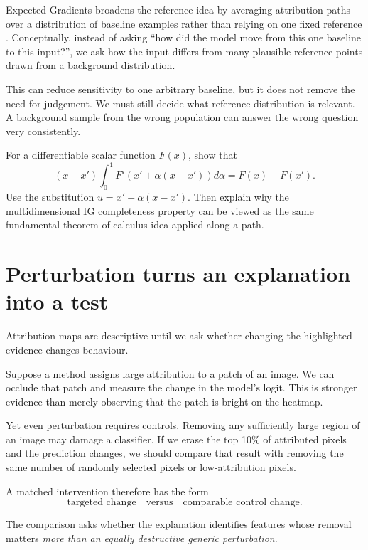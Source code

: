 Expected Gradients broadens the reference idea by averaging attribution paths over a distribution of baseline examples rather than relying on one fixed reference \parencite{erion2021}. Conceptually, instead of asking ``how did the model move from this one baseline to this input?'', we ask how the input differs from many plausible reference points drawn from a background distribution.

This can reduce sensitivity to one arbitrary baseline, but it does not remove the need for judgement. We must still decide what reference distribution is relevant. A background sample from the wrong population can answer the wrong question very consistently.

\begin{optionalexercise}[title={Optional mathematics --- completeness for a one-dimensional path}]
For a differentiable scalar function \(F(x)\), show that
\[
  (x-x')\int_0^1 F'\!\left(x'+\alpha(x-x')\right)d\alpha
  = F(x)-F(x').
\]
Use the substitution \(u=x'+\alpha(x-x')\). Then explain why the multidimensional IG completeness property can be viewed as the same fundamental-theorem-of-calculus idea applied along a path.
\end{optionalexercise}

\section{Perturbation turns an explanation into a test}

Attribution maps are descriptive until we ask whether changing the highlighted evidence changes behaviour.

Suppose a method assigns large attribution to a patch of an image. We can occlude that patch and measure the change in the model's logit. This is stronger evidence than merely observing that the patch is bright on the heatmap.

Yet even perturbation requires controls. Removing any sufficiently large region of an image may damage a classifier. If we erase the top 10\% of attributed pixels and the prediction changes, we should compare that result with removing the same number of randomly selected pixels or low-attribution pixels.

A matched intervention therefore has the form
\[
  \text{targeted change}
  \quad\text{versus}\quad
  \text{comparable control change}.
\]

The comparison asks whether the explanation identifies features whose removal matters \emph{more than an equally destructive generic perturbation}.

